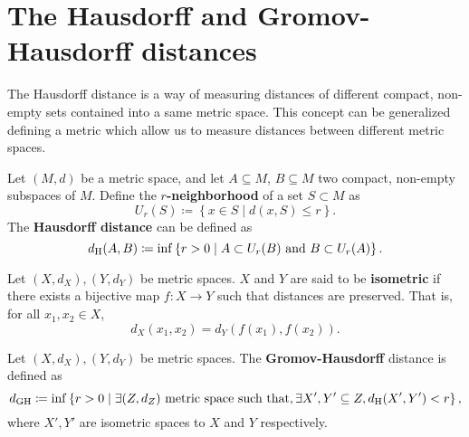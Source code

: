 \section{The Hausdorff and Gromov-Hausdorff distances} \label{sec:preliminaries-hausdorff}

The Hausdorff distance is a way of measuring distances of different compact, non-empty sets contained into a same metric space. This concept can be generalized defining a metric which allow us to measure distances between different metric spaces.

\begin{definition} \label{def:hausdorff-distance}
    Let $ (M, d) $ be a metric space, and let $ A \subseteq M $, $ B \subseteq M $ two compact, non-empty subspaces of $ M $. Define the {\bf $r$-neighborhood} of a set $ S \subset M $ as
    $$
        U_r(S) \coloneq \left\{ x \in S \mid d(x, S) \leq r \right\}.
    $$
    The {\bf Hausdorff distance} can be defined as
    $$
        d_{\operatorname{H}}(A, B) \coloneq \inf \left\{ r > 0 \mid A \subset U_r(B) \text{ and } B \subset U_r(A) \right\}.
    $$
\end{definition}

\begin{definition}
    Let $ (X, d_X), (Y, d_Y) $ be metric spaces. $ X $ and $ Y $ are said to be {\bf isometric} if there exists a bijective map $ f: X \to Y $ such that distances are preserved. That is, for all $ x_1, x_2 \in X $,
    $$
        d_X(x_1, x_2) = d_Y(f(x_1), f(x_2)).
    $$
\end{definition}

\begin{definition} \label{def:dgh}
    Let $ (X, d_X), (Y, d_Y) $ be metric spaces. The {\bf Gromov-Hausdorff} distance is defined as
    \begin{equation}
        d_{\operatorname{GH}} \coloneq \inf \left\{ r > 0 \mid \exists (Z, d_Z) \text{ metric space such that}, \exists X', Y' \subseteq Z, d_{\operatorname{H}}(X', Y') < r \right\},
    \end{equation}
    where $ X', Y' $ are isometric spaces to $ X $ and $ Y $ respectively.
\end{definition}

